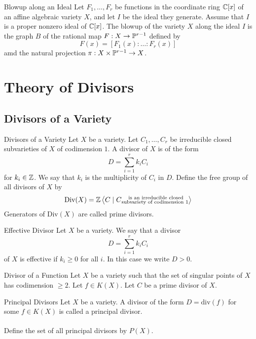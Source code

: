 \documentclass[a4paper]{article}
\begin{document}
\begin{defn}{Blowup along an Ideal}{} Let $F_1,\dots,F_r$ be functions in the coordinate ring $\mathbb{C}[x]$ of an affine algebraic variety $X$, and let $I$ be the ideal they generate. Assume that $I$ is a proper nonzero ideal of $\mathbb{C}[x]$. The blowup of the variety $X$ along the ideal $I$ is the graph $B$ of the rational map $F:X\to\mathbb{P}^{r-1}$ defined by $$F(x)=[F_1(x):\dots:F_r(x)]$$ amd the natural projection $\pi:X\times\mathbb{P}^{r-1}\to X$. 
\end{defn}

\pagebreak
\section{Theory of Divisors}
\subsection{Divisors of a Variety}
\begin{defn}{Divisors of a Variety}{} Let $X$ be a variety. Let $C_1,\dots,C_r$ be irreducible closed subvarieties of $X$ of codimension $1$. A divisor of $X$ is of the form $$D=\sum_{i=1}^rk_iC_i$$ for $k_i\in\mathbb{Z}$. We say that $k_i$ is the multiplicity of $C_i$ in $D$. Define the free group of all divisors of $X$ by $$\text{Div}(X)=\mathbb{Z}\left\langle C\;|\;C\substack{\text{ is an irreducible closed}\\\text{subvariety of codimension }1}\right\rangle$$ Generators of $\text{Div}(X)$ are called prime divisors. 
\end{defn}

\begin{defn}{Effective Divisor}{} Let $X$ be a variety. We say that a divisor $$D=\sum_{i=1}^rk_iC_i$$ of $X$ is effective if $k_i\geq 0$ for all $i$. In this case we write $D>0$. 
\end{defn}

\begin{defn}{Divisor of a Function}{} Let $X$ be a variety such that the set of singular points of $X$ has codimension $\geq 2$. Let $f\in K(X)$. Let $C$ be a prime divisor of $X$. 
\end{defn}

\begin{defn}{Principal Divisors}{} Let $X$ be a variety. A divisor of the form $D=\text{div}(f)$ for some $f\in K(X)$ is called a principal divisor. \\~\\
Define the set of all principal divisors by $P(X)$. 
\end{defn}
\end{document}
